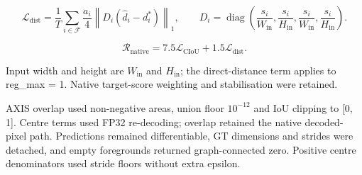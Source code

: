 \[
\mathcal L_{\mathrm{dist}}
=\frac{1}{T}\sum_{i\in\mathcal F}
\frac{a_i}{4}\left\|D_i(\hat d_i-d_i^*)\right\|_1,
\qquad
D_i=\operatorname{diag}\left(
\frac{s_i}{W_{\mathrm{in}}},\frac{s_i}{H_{\mathrm{in}}},
\frac{s_i}{W_{\mathrm{in}}},\frac{s_i}{H_{\mathrm{in}}}
\right).
\]

\[
\mathcal R_{\mathrm{native}}
=7.5\mathcal L_{\mathrm{CIoU}}+1.5\mathcal L_{\mathrm{dist}}.
\]

Input width and height are \(W_{\mathrm{in}}\) and \(H_{\mathrm{in}}\); the direct-distance term applies to reg\_max = 1. Native target-score weighting and stabilisation were retained.

AXIS overlap used non-negative areas, union floor \(10^{-12}\) and IoU clipping to [0, 1]. Centre terms used FP32 re-decoding; overlap retained the native decoded-pixel path. Predictions remained differentiable, GT dimensions and strides were detached, and empty foregrounds returned graph-connected zero. Positive centre denominators used stride floors without extra epsilon.

\FloatBarrier
